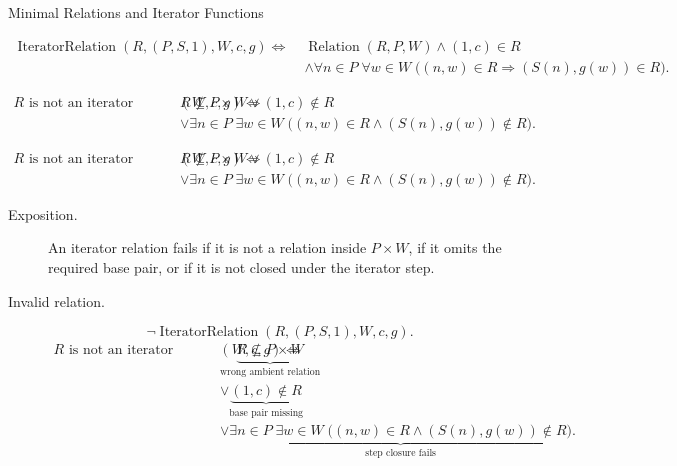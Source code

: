 \begin{topicbox}{Minimal Relations and Iterator Functions}
\begin{remark*}
\[
\begin{aligned}
\operatorname{IteratorRelation}(R,(P,S,1),W,c,g)
\Longleftrightarrow\;&
\operatorname{Relation}(R,P,W)
\land (1,c)\in R\\
&\land
\forall n\in P\;\forall w\in W\;
\bigl((n,w)\in R\Longrightarrow (S(n),g(w))\in R\bigr).
\end{aligned}
\]
\end{remark*}

\begin{remark*}
\[
\begin{aligned}
R \text{ is not an iterator relation for } (W,c,g)
\Longleftrightarrow\;&
R\not\subseteq P\times W
\lor (1,c)\notin R\\
&\lor \exists n\in P\;\exists w\in W\;
\bigl((n,w)\in R\land (S(n),g(w))\notin R\bigr).
\end{aligned}
\]
\end{remark*}

\begin{remark*}
\[
\begin{aligned}
R \text{ is not an iterator relation for } (W,c,g)
\Longleftrightarrow\;&
R\not\subseteq P\times W
\lor (1,c)\notin R\\
&\lor \exists n\in P\;\exists w\in W\;
\bigl((n,w)\in R\land (S(n),g(w))\notin R\bigr).
\end{aligned}
\]
\end{remark*}

\begin{remark*}
\begin{description}
  \item[Exposition.]
  An iterator relation fails if it is not a relation inside $P\times W$, if
  it omits the required base pair, or if it is not closed under the iterator
  step.
  \item[Invalid relation.]
  \[
  \neg\operatorname{IteratorRelation}(R,(P,S,1),W,c,g).
  \]
  \[
  \begin{aligned}
  R \text{ is not an iterator relation for } (W,c,g)
  \Longleftrightarrow\;&
  \underbrace{R\not\subseteq P\times W}_{\text{wrong ambient relation}}\\
  &\lor \underbrace{(1,c)\notin R}_{\text{base pair missing}}\\
  &\lor \underbrace{\exists n\in P\;\exists w\in W\;
  \bigl((n,w)\in R\land (S(n),g(w))\notin R\bigr)}_{\text{step closure fails}}.
  \end{aligned}
  \]
\end{description}
\end{remark*}


\end{topicbox}
